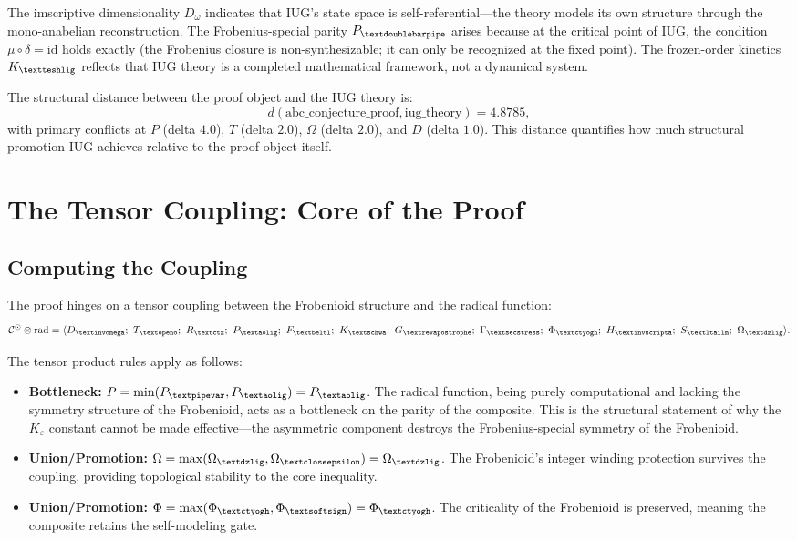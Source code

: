 \documentclass[12pt]{article}
\newcommand{\invomega}{\text{\textinvomega}}
\newcommand{\aolig}{\text{\textaolig}}
\newcommand{\beltl}{\text{\textbeltl}}
\newcommand{\revapostrophe}{\text{\textrevapostrophe}}
\newcommand{\secstress}{\text{\textsecstress}}
\newcommand{\softsign}{\text{\textsoftsign}}
\newcommand{\closeepsilon}{\text{\textcloseepsilon}}
\newcommand{\igschwa}{\text{\textschwa}}
\newcommand{\ctyogh}{\text{\textctyogh}}
\newcommand{\invscripta}{\text{\textinvscripta}}
\newcommand{\ltailm}{\text{\textltailm}}
\newcommand{\openo}{\text{\textopeno}}
\newcommand{\ctz}{\text{\textctz}}
\newcommand{\pipevar}{\text{\textpipevar}}
\newcommand{\dzlig}{\text{\textdzlig}}
\newcommand{\doublebarpipe}{\text{\textdoublebarpipe}}
\newcommand{\teshlig}{\text{\textteshlig}}
\begin{document}
The imscriptive dimensionality $D_\omega$ indicates that IUG's state space is self-referential---the theory models its own structure through the mono-anabelian reconstruction. The Frobenius-special parity $P_{\doublebarpipe}$ arises because at the critical point of IUG, the condition $\mu \circ \delta = \text{id}$ holds exactly (the Frobenius closure is non-synthesizable; it can only be recognized at the fixed point). The frozen-order kinetics $K_{\teshlig}$ reflects that IUG theory is a completed mathematical framework, not a dynamical system.

The structural distance between the proof object and the IUG theory is:
\begin{equation}
d(\text{abc\_conjecture\_proof}, \text{iug\_theory}) = 4.8785,
\end{equation}
with primary conflicts at $P$ (delta $4.0$), $T$ (delta $2.0$), $\Omega$ (delta $2.0$), and $D$ (delta $1.0$). This distance quantifies how much structural promotion IUG achieves relative to the proof object itself.

\section{The Tensor Coupling: Core of the Proof}

\subsection{Computing the Coupling}

The proof hinges on a tensor coupling between the Frobenioid structure and the radical function:
\begin{equation}
\mathcal{C}^\odot \otimes \text{rad} = \langle D_{\invomega};\ T_{\openo};\ R_{\ctz};\ P_{\aolig};\ F_{\beltl};\ K_{\igschwa};\ G_{\revapostrophe};\ \Gamma_{\secstress};\ \Phi_{\ctyogh};\ H_{\invscripta};\ S_{\ltailm};\ \Omega_{\dzlig} \rangle.
\end{equation}

The tensor product rules apply as follows:

\begin{itemize}
\item \textbf{Bottleneck:} $P = \min(P_{\pipevar}, P_{\aolig}) = P_{\aolig}$. The radical function, being purely computational and lacking the symmetry structure of the Frobenioid, acts as a bottleneck on the parity of the composite. This is the structural statement of why the $K_\varepsilon$ constant cannot be made effective---the asymmetric component destroys the Frobenius-special symmetry of the Frobenioid.

\item \textbf{Union/Promotion:} $\Omega = \max(\Omega_{\dzlig}, \Omega_{\closeepsilon}) = \Omega_{\dzlig}$. The Frobenioid's integer winding protection survives the coupling, providing topological stability to the core inequality.

\item \textbf{Union/Promotion:} $\Phi = \max(\Phi_{\ctyogh}, \Phi_{\softsign}) = \Phi_{\ctyogh}$. The criticality of the Frobenioid is preserved, meaning the composite retains the self-modeling gate.
\end{itemize}
\end{document}

